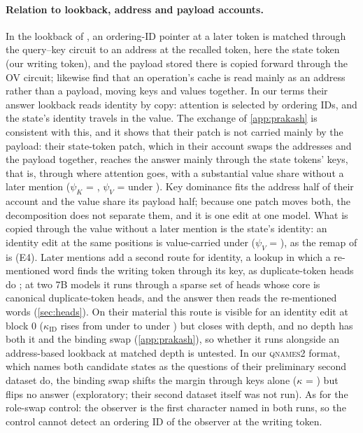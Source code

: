 \paragraph{Relation to lookback, address and payload accounts.}
In the lookback of \citet[Sec.~2]{prakash2025lookbacks}, an ordering-ID pointer at a later token is matched through the query--key circuit to an address at the recalled token, here the state token (our writing token), and the payload stored there is copied forward through the OV circuit; \citet{wu2026record} likewise find that an operation's cache is read mainly as an address rather than a payload, moving keys and values together. In our terms their answer lookback reads identity by copy: attention is selected by ordering IDs, and the state's identity travels in the value. The exchange of \cref{app:prakash} is consistent with this, and it shows that their patch is not carried mainly by the payload: their state-token patch, which in their account swaps the addresses and the payload together, reaches the answer mainly through the state tokens' keys, that is, through where attention goes, with a substantial value share without a later mention ($\psi_K$ = \PkPsiKBindNone{}, $\psi_V$ = \PkPsiVBindNone{} under \fmtNone{}). Key dominance fits the address half of their account and the value share its payload half; because one patch moves both, the decomposition does not separate them, and it is one edit at one model. What is copied through the value without a later mention is the state's identity: an identity edit at the same positions is value-carried under \fmtNone{} ($\psi_V$ = \PkPsiVIdZeroNone{}), as the remap of \citet{anonymous2026fitted} is (E4). Later mentions add a second route for identity, a lookup in which a re-mentioned word finds the writing token through its key, as duplicate-token heads do \citep{wang2022ioi}; at two 7B models it runs through a sparse set of heads whose core is canonical duplicate-token heads, and the answer then reads the re-mentioned words (\cref{sec:heads}). On their material this route is visible for an identity edit at block 0 ($\kappa_{\mathrm{ID}}$ rises from \PkKappaIdZeroNone{} under \fmtNone{} to \PkKappaIdZeroOpt{} under \fmtOpt{}) but closes with depth, and no depth has both it and the binding swap (\cref{app:prakash}), so whether it runs alongside an address-based lookback at matched depth is untested. In our \textsc{qnames2} format, which names both candidate states as the questions of their preliminary second dataset do, the binding swap shifts the margin through keys alone ($\kappa$ = \PkKappaBindQnamestwo{}) but flips no answer (exploratory; their second dataset itself was not run). As for the role-swap control: the observer is the first character named in both runs, so the control cannot detect an ordering ID of the observer at the writing token.
